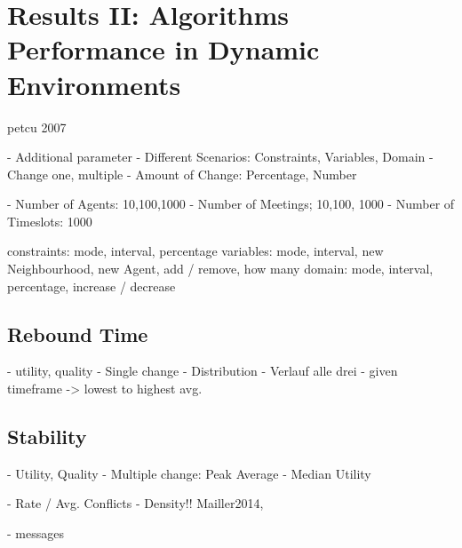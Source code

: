 \section{Results II: Algorithms Performance in Dynamic Environments}

petcu 2007

- Additional parameter
- Different Scenarios: Constraints, Variables, Domain
- Change one, multiple
- Amount of Change: Percentage, Number

- Number of Agents: 10,100,1000
- Number of Meetings; 10,100, 1000
- Number of Timeslots: 1000

constraints: mode, interval, percentage
variables: mode, interval, new Neighbourhood, new Agent, add / remove, how many
domain: mode, interval, percentage, increase / decrease

\subsection{Rebound Time}
- utility, quality
- Single change
- Distribution
- Verlauf alle drei
- given timeframe -> lowest to highest avg.

\subsection{Stability}

\cite{Verfaillie2005}

- Utility, Quality
- Multiple change: Peak Average
- Median Utility

- Rate / Avg. Conflicts - Density!! Mailler2014, 

- messages

